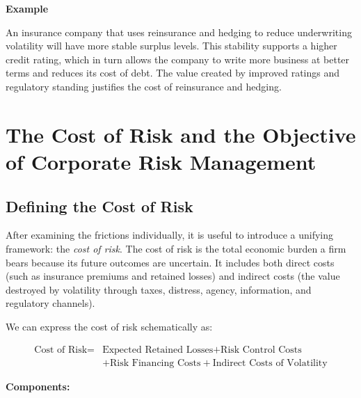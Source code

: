 \documentclass[11pt,openany]{book}
\begin{document}
\textbf{Example}

An insurance company that uses reinsurance and hedging to reduce underwriting volatility will have more stable surplus levels. This stability supports a higher credit rating, which in turn allows the company to write more business at better terms and reduces its cost of debt. The value created by improved ratings and regulatory standing justifies the cost of reinsurance and hedging.


\section{The Cost of Risk and the Objective of Corporate Risk Management}\label{the-cost-of-risk-and-the-objective-of-corporate-risk-management}

\subsection{Defining the Cost of Risk}\label{defining-the-cost-of-risk}

After examining the frictions individually, it is useful to introduce a unifying framework: the \emph{cost of risk}. The cost of risk is the total economic burden a firm bears because its future outcomes are uncertain. It includes both direct costs (such as insurance premiums and retained losses) and indirect costs (the value destroyed by volatility through taxes, distress, agency, information, and regulatory channels).

We can express the cost of risk schematically as:

\[
\begin{aligned}
\text{Cost of Risk} ={}& \text{Expected Retained Losses} + \text{Risk Control Costs} \\
&+ \text{Risk Financing Costs} + \text{Indirect Costs of Volatility}
\end{aligned}
\]

\textbf{Components:}
\end{document}
